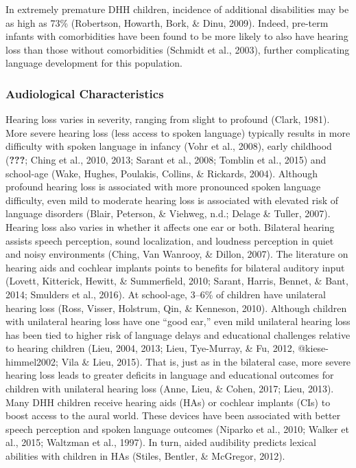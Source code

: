 \documentclass[english,man,floatsintext]{apa6}
\begin{document}
In extremely premature DHH children, incidence of additional disabilities may be as high as 73\% (Robertson, Howarth, Bork, \& Dinu, 2009). Indeed, pre-term infants with comorbidities have been found to be more likely to also have hearing loss than those without comorbidities (Schmidt et al., 2003), further complicating language development for this population.

\hypertarget{audiological-characteristics}{%
\subsubsection{Audiological Characteristics}\label{audiological-characteristics}}

Hearing loss varies in severity, ranging from slight to profound (Clark, 1981). More severe hearing loss (less access to spoken language) typically results in more difficulty with spoken language in infancy (Vohr et al., 2008), early childhood ({\textbf{???}}; Ching et al., 2010, 2013; Sarant et al., 2008; Tomblin et al., 2015) and school-age (Wake, Hughes, Poulakis, Collins, \& Rickards, 2004). Although profound hearing loss is associated with more pronounced spoken language difficulty, even mild to moderate hearing loss is associated with elevated risk of language disorders (Blair, Peterson, \& Viehweg, n.d.; Delage \& Tuller, 2007).
Hearing loss also varies in whether it affects one ear or both. Bilateral hearing assists speech perception, sound localization, and loudness perception in quiet and noisy environments (Ching, Van Wanrooy, \& Dillon, 2007). The literature on hearing aids and cochlear implants points to benefits for bilateral auditory input (Lovett, Kitterick, Hewitt, \& Summerfield, 2010; Sarant, Harris, Bennet, \& Bant, 2014; Smulders et al., 2016). At school-age, 3--6\% of children have unilateral hearing loss (Ross, Visser, Holstrum, Qin, \& Kenneson, 2010). Although children with unilateral hearing loss have one \enquote{good ear,} even mild unilateral hearing loss has been tied to higher risk of language delays and educational challenges relative to hearing children (Lieu, 2004, 2013; Lieu, Tye-Murray, \& Fu, 2012, @kiese-himmel2002; Vila \& Lieu, 2015). That is, just as in the bilateral case, more severe hearing loss leads to greater deficits in language and educational outcomes for children with unilateral hearing loss (Anne, Lieu, \& Cohen, 2017; Lieu, 2013).
Many DHH children receive hearing aids (HAs) or cochlear implants (CIs) to boost access to the aural world. These devices have been associated with better speech perception and spoken language outcomes (Niparko et al., 2010; Walker et al., 2015; Waltzman et al., 1997). In turn, aided audibility predicts lexical abilities with children in HAs (Stiles, Bentler, \& McGregor, 2012).
\end{document}
